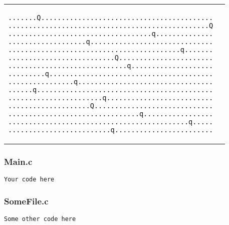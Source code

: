 \documentclass{article}
\begin{document}
\begin{tabular}{m{5cm}|m{5cm}}
\begin{verbatim}
.......Q..........................................
.................................................Q
...................................q..............
...................q..............................
..........................................q.......
..........................Q.......................
.............................q....................
.........q........................................
................q.................................
......q...........................................
.......................q..........................
....................Q.............................
................................q.................
............................................q.....
.........................q........................
\end{verbatim}
\end{tabular}

\subsubsection*{Main.c}
\begin{lstlisting}
Your code here
\end{lstlisting}

\subsubsection*{SomeFile.c}
\begin{lstlisting}
Some other code here
\end{lstlisting}
\end{document}
